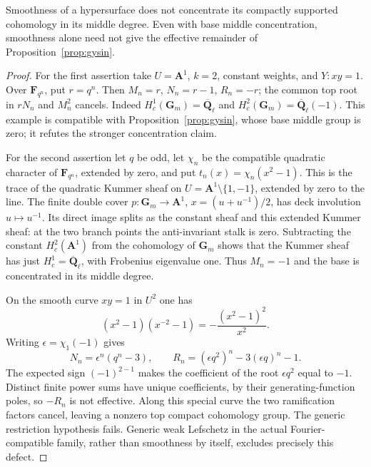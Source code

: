 \begin{proposition}
Smoothness of a hypersurface does not concentrate its compactly supported
cohomology in its middle degree.  Even with base middle concentration,
smoothness alone need not give the effective remainder of
Proposition~\ref{prop:gysin}.
\end{proposition}
\begin{proof}
For the first assertion take $U=\mathbf A^1$, $k=2$, constant weights,
and $Y:xy=1$.  Over $\mathbf F_{q^n}$, put $r=q^n$.
Then $M_n=r$, $N_n=r-1$, $R_n=-r$; the common top root in
$rN_n$ and $M_n^2$ cancels.  Indeed
$H_c^1(\mathbf G_m)=\overline{\mathbf Q}_\ell$ and
$H_c^2(\mathbf G_m)=\overline{\mathbf Q}_\ell(-1)$.
This example is compatible with Proposition~\ref{prop:gysin}, whose
base middle group is zero; it refutes the stronger concentration claim.

For the second assertion let $q$ be odd, let $\chi_n$ be the compatible
quadratic character of $\mathbf F_{q^n}$, extended by zero, and put
$t_n(x)=\chi_n(x^2-1)$.  This is the trace of the quadratic Kummer sheaf
on $U=\mathbf A^1\setminus\{1,-1\}$, extended by zero to the line.
The finite double cover $p:\mathbf G_m\to\mathbf A^1$,
$x=(u+u^{-1})/2$, has deck involution $u\mapsto u^{-1}$.
Its direct image splits as the constant sheaf and this extended Kummer
sheaf: at the two branch points the anti-invariant stalk is zero.
Subtracting the constant $H_c^2(\mathbf A^1)$ from the cohomology of
$\mathbf G_m$ shows that the Kummer sheaf has just
$H_c^1=\overline{\mathbf Q}_\ell$, with Frobenius eigenvalue one.
Thus $M_n=-1$ and the base is concentrated in its middle degree.

On the smooth curve $xy=1$ in $U^2$ one has
\[
 (x^2-1)(x^{-2}-1)=-\frac{(x^2-1)^2}{x^2}.
\]
Writing $\epsilon=\chi_1(-1)$ gives
\[
 N_n=\epsilon^n(q^n-3),\qquad
 R_n=(\epsilon q^2)^n-3(\epsilon q)^n-1.
\]
The expected sign $(-1)^{2-1}$ makes the coefficient of the root
$\epsilon q^2$ equal to $-1$.  Distinct finite power sums have unique
coefficients, by their generating-function poles, so $-R_n$ is not
effective.  Along this special curve the two ramification factors
cancel, leaving a nonzero top compact cohomology group.  The generic
restriction hypothesis fails.  Generic weak Lefschetz in the actual
Fourier-compatible family, rather than smoothness by itself, excludes
precisely this defect.
\end{proof}

